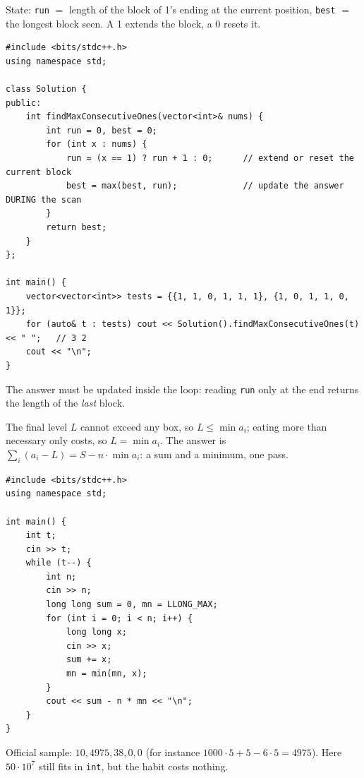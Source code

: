 \begin{solutionbox}
State: \texttt{run} $=$ length of the block of 1's ending at the current position, \texttt{best} $=$ the longest block seen. A 1 extends the block, a 0 resets it.
\begin{lstlisting}[style=cpp]
#include <bits/stdc++.h>
using namespace std;

class Solution {
public:
    int findMaxConsecutiveOnes(vector<int>& nums) {
        int run = 0, best = 0;
        for (int x : nums) {
            run = (x == 1) ? run + 1 : 0;      // extend or reset the current block
            best = max(best, run);             // update the answer DURING the scan
        }
        return best;
    }
};

int main() {
    vector<vector<int>> tests = {{1, 1, 0, 1, 1, 1}, {1, 0, 1, 1, 0, 1}};
    for (auto& t : tests) cout << Solution().findMaxConsecutiveOnes(t) << " ";   // 3 2
    cout << "\n";
}
\end{lstlisting}
\begin{center}
\end{center}
The answer must be updated inside the loop: reading \texttt{run} only at the end returns the length of the \emph{last} block.
\end{solutionbox}

\begin{solutionbox}
The final level $L$ cannot exceed any box, so $L \le \min a_i$; eating more than necessary only costs, so $L = \min a_i$. The answer is $\sum_i (a_i - L) = S - n \cdot \min a_i$: a sum and a minimum, one pass.
\begin{lstlisting}[style=cpp]
#include <bits/stdc++.h>
using namespace std;

int main() {
    int t;
    cin >> t;
    while (t--) {
        int n;
        cin >> n;
        long long sum = 0, mn = LLONG_MAX;
        for (int i = 0; i < n; i++) {
            long long x;
            cin >> x;
            sum += x;
            mn = min(mn, x);
        }
        cout << sum - n * mn << "\n";
    }
}
\end{lstlisting}
Official sample: $10, 4975, 38, 0, 0$ (for instance $1000\cdot5 + 5 - 6\cdot5 = 4975$). Here $50\cdot10^7$ still fits in \texttt{int}, but the habit costs nothing.
\end{solutionbox}

